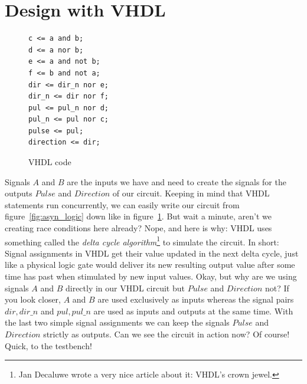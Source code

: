 \documentclass[a4paper]{article}
\begin{document}
\section{Design with VHDL}
\begin{figure}
\centering
\begin{BVerbatim}
c <= a and b;
d <= a nor b;
e <= a and not b;
f <= b and not a;
dir <= dir_n nor e;
dir_n <= dir nor f;
pul <= pul_n nor d;
pul_n <= pul nor c;
pulse <= pul;
direction <= dir;
\end{BVerbatim}
\caption{VHDL code}
\label{fig:asyn_vhdl}
\end{figure}
Signals $A$ and $B$ are the inputs we have and need to create the signals for the outputs $Pulse$ and $Direction$ of our circuit.
Keeping in mind that VHDL statements run concurrently, we can easily write our circuit from figure~\ref{fig:asyn_logic} down like in figure~\ref{fig:asyn_vhdl}.
But wait a minute, aren't we creating race conditions here already?
Nope, and here is why: VHDL uses something called the \emph{delta cycle algorithm}\footnote{Jan Decaluwe wrote a very nice article about it: VHDL's crown jewel.} to simulate the circuit.
In short: Signal assignments in VHDL get their value updated in the next delta cycle, just like a physical logic gate would deliver its new resulting output value after some time has past when stimulated by new input values.
Okay, but why are we using signals $A$ and $B$ directly in our VHDL circuit but $Pulse$ and $Direction$ not?
If you look closer, $A$ and $B$ are used exclusively as inputs whereas the signal pairs $dir,dir\_n$ and $pul,pul\_n$ are used as inputs and outputs at the same time.
With the last two simple signal assignments we can keep the signals $Pulse$ and $Direction$ strictly as outputs.
Can we see the circuit in action now? Of course! Quick, to the testbench!
\newpage
\end{document}
